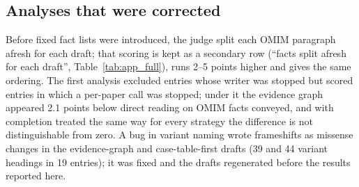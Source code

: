 \documentclass{article} %
\begin{document}
\FloatBarrier
\subsection{Analyses that were corrected}
\label{app:corrected}
Before fixed fact lists were introduced, the judge split each OMIM paragraph afresh for each draft; that scoring is kept as a secondary row (``facts split afresh for each draft'', Table~\ref{tab:app_full}), runs 2--5 points higher and gives the same ordering. The first analysis excluded entries whose writer was stopped but scored entries in which a per-paper call was stopped; under it the evidence graph appeared 2.1 points below direct reading on OMIM facts conveyed, and with completion treated the same way for every strategy the difference is not distinguishable from zero. A bug in variant naming wrote frameshifts as missense changes in the evidence-graph and case-table-first drafts (39 and 44 variant headings in 19 entries); it was fixed and the drafts regenerated before the results reported here.
\FloatBarrier
\FloatBarrier
\FloatBarrier
\end{document}
